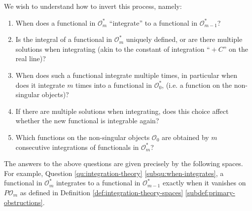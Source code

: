 \begin{questions}
	\label{qu:integration-theory}
	We wish to understand how to invert this process, namely:
	\begin{enumerate}
		\item When does a functional in \(\mathcal{O}^{\ast}_{m}\) ``integrate'' to a functional in \(\mathcal{O}^{\ast}_{m - 1}\)?
		\label{subqu:when-integrates}
		\item Is the integral of a functional in \(\mathcal{O}_{m}^{\ast}\) uniquely defined, or are there multiple solutions when integrating (akin to the constant of integration ``\({}+C\)'' on the real line)?
		\label{subqu:integral-defined-uniquely-or-constants}
		\item When does such a functional integrate multiple times, in particular when does it integrate \(m\) times into a functional in \(\mathcal{O}^{\ast}_{0}\), (i.e. a function on the non-singular objects)?
		\label{subqu:when-integrates-multiple-times}
		\item If there are multiple solutions when integrating, does this choice affect whether the new functional is integrable again?
		\label{subqu:multiple-solutions-affects-integrates-multiple-times}
		\item Which functions on the non-singular objects \(\mathcal{O}_{0}\) are obtained by \(m\) consecutive integrations of functionals in \(\mathcal{O}_{m}^{\ast}\)?
		\label{subqu:which-functionals-derivatives}
	\end{enumerate}
\end{questions}
The answers to the above questions are given precisely by the following spaces. For example, Question \ref{qu:integration-theory} \ref{subqu:when-integrates}, a functional in \(\mathcal{O}^{\ast}_{m}\) integrates to a functional in \(\mathcal{O}^{\ast}_{m - 1}\) exactly when it vanishes on \(P\mathcal{O}_{m}\) as defined in Definition \ref{def:integration-theory-spaces} \ref{subdef:primary-obstructions}. 
